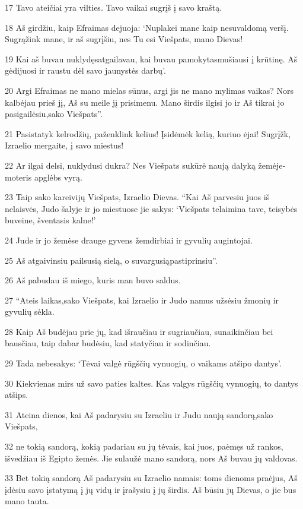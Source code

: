 \par 17 Tavo ateičiai yra vilties. Tavo vaikai sugrįš į savo kraštą. 
\par 18 Aš girdžiu, kaip Efraimas dejuoja: ‘Nuplakei mane kaip nesuvaldomą veršį. Sugrąžink mane, ir aš sugrįšiu, nes Tu esi Viešpats, mano Dievas! 
\par 19 Kai aš buvau nuklydęs­atgailavau, kai buvau pamokytas­mušiausi į krūtinę. Aš gėdijuosi ir raustu dėl savo jaunystės darbų’. 
\par 20 Argi Efraimas ne mano mielas sūnus, argi jis ne mano mylimas vaikas? Nors kalbėjau prieš jį, Aš su meile jį prisimenu. Mano širdis ilgisi jo ir Aš tikrai jo pasigailėsiu,­sako Viešpats”. 
\par 21 Pasistatyk kelrodžių, paženklink kelius! Įsidėmėk kelią, kuriuo ėjai! Sugrįžk, Izraelio mergaite, į savo miestus! 
\par 22 Ar ilgai delsi, nuklydusi dukra? Nes Viešpats sukūrė naują dalyką žemėje­moteris apglėbs vyrą. 
\par 23 Taip sako kareivijų Viešpats, Izraelio Dievas. “Kai Aš parvesiu juos iš nelaisvės, Judo šalyje ir jo miestuose jie sakys: ‘Viešpats telaimina tave, teisybės buveine, šventasis kalne!’ 
\par 24 Jude ir jo žemėse drauge gyvens žemdirbiai ir gyvulių augintojai. 
\par 25 Aš atgaivinsiu pailsusią sielą, o suvargusią­pastiprinsiu”. 
\par 26 Aš pabudau iš miego, kuris man buvo saldus. 
\par 27 “Ateis laikas,­sako Viešpats,­ kai Izraelio ir Judo namus užsėsiu žmonių ir gyvulių sėkla. 
\par 28 Kaip Aš budėjau prie jų, kad išraučiau ir sugriaučiau, sunaikinčiau bei bausčiau, taip dabar budėsiu, kad statyčiau ir sodinčiau. 
\par 29 Tada nebesakys: ‘Tėvai valgė rūgščių vynuogių, o vaikams atšipo dantys’. 
\par 30 Kiekvienas mirs už savo paties kaltes. Kas valgys rūgščių vynuogių, to dantys atšips. 
\par 31 Ateina dienos, kai Aš padarysiu su Izraeliu ir Judu naują sandorą,­sako Viešpats,­ 
\par 32 ne tokią sandorą, kokią padariau su jų tėvais, kai juos, paėmęs už rankos, išvedžiau iš Egipto žemės. Jie sulaužė mano sandorą, nors Aš buvau jų valdovas. 
\par 33 Bet tokią sandorą Aš padarysiu su Izraelio namais: toms dienoms praėjus, Aš įdėsiu savo įstatymą į jų vidų ir įrašysiu į jų širdis. Aš būsiu jų Dievas, o jie bus mano tauta. 
